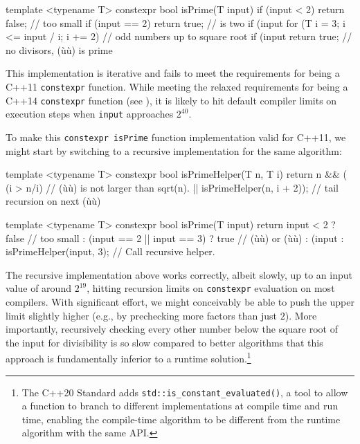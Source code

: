 \begin{emcppslisting}[emcppsstandards={c++14}]
template <typename T>
constexpr bool isPrime(T input)
{
    if (input < 2) return false;               // too small
    if (input == 2) return true;               // is two
    if (input %
    for (T i = 3; i <= input / i; i += 2)      // odd numbers up to square root
    {
        if (input %
    }
    return true;                               // no divisors, (ù{}ù) is prime
}
\end{emcppslisting}


\noindent This implementation is iterative and fails to meet the requirements for
being a C++11 \lstinline!constexpr! function. While meeting the relaxed
requirements for being a C++14 \lstinline!constexpr! function (see
), it is likely to hit default compiler
limits on execution steps when \lstinline!input! approaches $2^{40}$.

To make this \lstinline!constexpr!~\lstinline!isPrime! function implementation
valid for C++11, we might start by switching to a recursive
implementation for the same algorithm:

\begin{emcppslisting}
template <typename T>
constexpr bool isPrimeHelper(T n, T i)
{
    return n %
        && (   (i > n/i)                  // (ù{}ù) is not larger than sqrt(n).
            || isPrimeHelper(n, i + 2));  // tail recursion on next (ù{}ù)
}

template <typename T>
constexpr bool isPrime(T input)
{
    return input < 2                  ? false  // too small
         : (input == 2 || input == 3) ? true   // (ù{}ù) or (ù{}ù)
         : (input %
         : isPrimeHelper(input, 3);            // Call recursive helper.
}
\end{emcppslisting}


\noindent The recursive implementation above works correctly, albeit slowly, up to
an input value of around $2^{19}$, hitting recursion limits on
\lstinline!constexpr! evaluation on most compilers. With significant
effort, we might conceivably be able to push the upper limit slightly
higher (e.g., by prechecking more factors than just $2$). More
importantly, recursively checking every other number below the square
root of the input for divisibility is so slow compared to better
algorithms that this approach is fundamentally inferior to a runtime
solution.{\cprotect\footnote{The C++20 Standard adds
\lstinline!std::is_constant_evaluated()!, a tool to allow a function to
branch to different implementations at compile time and run time,
enabling the compile-time algorithm to be different from the runtime
  algorithm with the same API.}}

